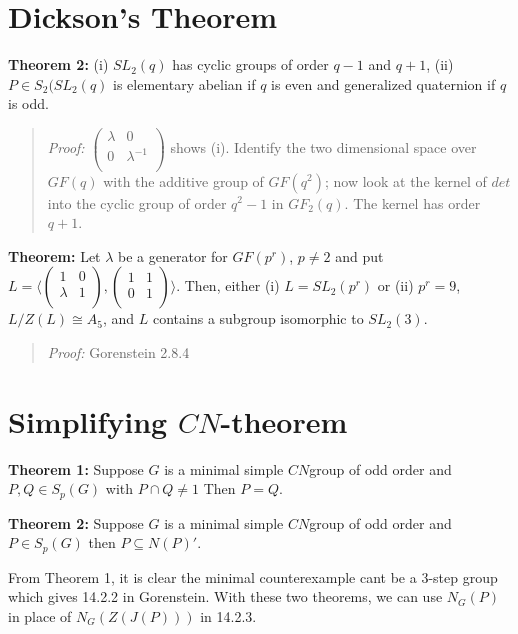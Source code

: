 \section{Dickson's Theorem}
{\bf Theorem 2:} (i) $SL_2(q)$ has cyclic groups of order $q-1$ and $q+1$, (ii) $P \in S_2(SL_2(q)$ is
elementary abelian if $q$ is even and generalized quaternion if $q$ is odd.
\begin{quote}
\emph{Proof:}
$ \left(
\begin{array}{cc}
\lambda  &  0 \\
0 &  {\lambda}^{-1} \\
\end{array}
\right)$ shows (i). Identify the two dimensional space over $GF(q)$ with the additive group of $GF(q^2)$;
now look at the kernel of $det$ into the cyclic group of order $q^2-1$ in $GF_2(q)$.  The kernel has order $q+1$.
\end{quote}
{\bf Theorem:} Let $\lambda$ be a generator for $GF(p^r )$, $p \ne 2$ and put
$L= \langle
\left(
\begin{array}{cc}
1 &  0 \\
\lambda &  1 \\
\end{array}
\right),
\left(
\begin{array}{cc}
1 &  1\\
0 &  1\\
\end{array}
\right)
\rangle$. Then, either (i) $L=SL_2(p^r)$ or (ii) $p^r=9$, $L/Z(L) \cong A_5$, and
$L$ contains a subgroup isomorphic to $SL_2(3)$.
\begin{quote}
\emph{Proof:}
Gorenstein 2.8.4
\end{quote}
\section{Simplifying $CN$-theorem}
{\bf Theorem 1:} Suppose $G$ is a minimal simple $CN$group of odd order and $P, Q \in S_p(G)$ with
$P \cap Q \ne 1$  Then $P=Q$.
\begin{quote}
\end{quote}
{\bf Theorem 2:} Suppose $G$ is a minimal simple $CN$group of odd order and $P \in S_p(G)$ then
$P \subseteq N(P)'$.
\begin{quote}
\end{quote}
From Theorem 1, it is clear the minimal counterexample cant be a $3$-step group which gives 14.2.2 in Gorenstein.  With these two theorems, we can use $N_G(P)$ in place of $N_G(Z(J(P)))$ in 14.2.3.
